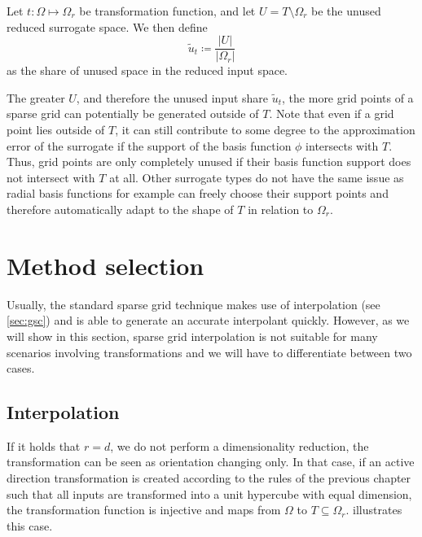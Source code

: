 \documentclass[
  a4paper,  %
  twoside,  %
  bibliography=totoc,
  headsepline,
  cleardoublepage=empty,
  parskip=half,
  draft=false
]{scrbook}
\begin{document}
\begin{definition}
Let $t \colon \Omega \mapsto \Omega_r$ be transformation function, and let $U=T \setminus \Omega_r$ be the unused reduced surrogate space.
We then define
\begin{equation}
\tilde{u}_t \coloneqq \frac{|U|}{|\Omega_r|}
\end{equation}
as the share of unused space in the reduced input space.
\end{definition}
%
The greater $U$, and therefore the unused input share $\tilde{u}_t$, the more grid points of a sparse grid can potentially be generated outside of $T$.
Note that even if a grid point lies outside of $T$, it can still contribute to some degree to the approximation error of the surrogate if the support of the basis function $\phi$ intersects with $T$.
Thus, grid points are only completely unused if their basis function support does not intersect with $T$ at all.
Other surrogate types do not have the same issue as radial basis functions for example can freely choose their support points and therefore automatically adapt to the shape of $T$ in relation to $\Omega_r$.

\section{Method selection}
\label{sec:ms}

Usually, the standard sparse grid technique makes use of interpolation (see \cref{sec:gsc}) and is able to generate an accurate interpolant quickly.
However, as we will show in this section, sparse grid interpolation is not suitable for many scenarios involving transformations and we will have to differentiate between two cases.

\subsection{Interpolation}
If it holds that $r=d$, \ie we do not perform a dimensionality reduction, the transformation can be seen as orientation changing only.
In that case, if an active direction transformation is created according to the rules of the previous chapter such that all inputs are transformed into a unit hypercube with equal dimension, the transformation function is injective and maps from $\Omega$ to $T \subseteq \Omega_r$.
 illustrates this case.
\end{document}
